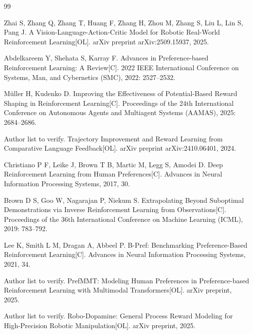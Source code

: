 \clearpage
\begin{thebibliography}{99}

    Zhai S, Zhang Q, Zhang T, Huang F, Zhang H, Zhou M, Zhang S, Liu L, Lin S, Pang J.
    A Vision-Language-Action-Critic Model for Robotic Real-World Reinforcement Learning[OL].
    arXiv preprint arXiv:2509.15937, 2025.
    
    Abdelkareem Y, Shehata S, Karray F.
    Advances in Preference-based Reinforcement Learning: A Review[C].
    2022 IEEE International Conference on Systems, Man, and Cybernetics (SMC), 2022: 2527--2532.
    
    Müller H, Kudenko D.
    Improving the Effectiveness of Potential-Based Reward Shaping in Reinforcement Learning[C].
    Proceedings of the 24th International Conference on Autonomous Agents and Multiagent Systems (AAMAS), 2025: 2684--2686.
    
    Author list to verify.
    Trajectory Improvement and Reward Learning from Comparative Language Feedback[OL].
    arXiv preprint arXiv:2410.06401, 2024.
    
    Christiano P F, Leike J, Brown T B, Martic M, Legg S, Amodei D.
    Deep Reinforcement Learning from Human Preferences[C].
    Advances in Neural Information Processing Systems, 2017, 30.
    
    Brown D S, Goo W, Nagarajan P, Niekum S.
    Extrapolating Beyond Suboptimal Demonstrations via Inverse Reinforcement Learning from Observations[C].
    Proceedings of the 36th International Conference on Machine Learning (ICML), 2019: 783--792.
    
    Lee K, Smith L M, Dragan A, Abbeel P.
    B-Pref: Benchmarking Preference-Based Reinforcement Learning[C].
    Advances in Neural Information Processing Systems, 2021, 34.
    
    Author list to verify.
    PrefMMT: Modeling Human Preferences in Preference-based Reinforcement Learning with Multimodal Transformers[OL].
    arXiv preprint, 2025.
    
    Author list to verify.
    Robo-Dopamine: General Process Reward Modeling for High-Precision Robotic Manipulation[OL].
    arXiv preprint, 2025.
    

\end{thebibliography}
